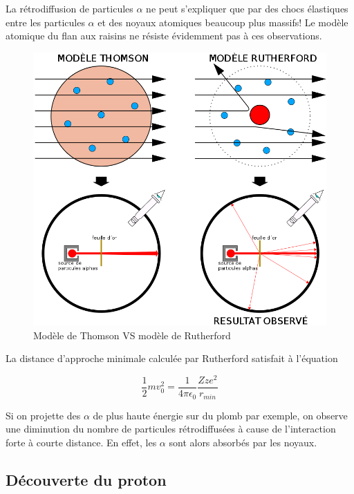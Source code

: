     La rétrodiffusion de particules $\alpha$ ne peut s’expliquer que par des chocs élastiques entre les particules $\alpha$ et des noyaux atomiques beaucoup plus massifs! Le modèle atomique du flan aux raisins ne résiste évidemment pas à ces observations.
    
    \begin{figure}[ht]
        \centering
        \includegraphics[scale=0.25]{Images1/thom_ruth.png}
        \caption{Modèle de Thomson VS modèle de Rutherford}
    \end{figure}

    La distance d'approche minimale calculée par Rutherford satisfait à l'équation
    
    $$\dfrac{1}{2}mv_0^2=\dfrac{1}{4\pi\epsilon_0}\dfrac{Zze^2}{r_{min}}$$

    Si on projette des $\alpha$ de plus haute énergie sur du plomb par exemple, on observe une diminution du nombre de particules rétrodiffusées à cause de l'interaction forte à courte distance. En effet, les $\alpha$ sont alors absorbés par les noyaux. 

    \subsection{Découverte du proton}
    
